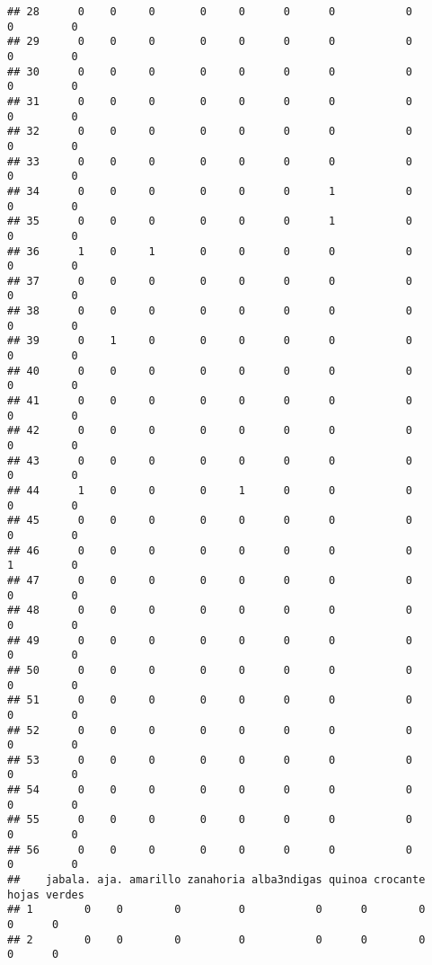 \documentclass[
]{article}
\begin{document}
\begin{verbatim}
## 28      0    0     0       0     0      0      0           0        0         0
## 29      0    0     0       0     0      0      0           0        0         0
## 30      0    0     0       0     0      0      0           0        0         0
## 31      0    0     0       0     0      0      0           0        0         0
## 32      0    0     0       0     0      0      0           0        0         0
## 33      0    0     0       0     0      0      0           0        0         0
## 34      0    0     0       0     0      0      1           0        0         0
## 35      0    0     0       0     0      0      1           0        0         0
## 36      1    0     1       0     0      0      0           0        0         0
## 37      0    0     0       0     0      0      0           0        0         0
## 38      0    0     0       0     0      0      0           0        0         0
## 39      0    1     0       0     0      0      0           0        0         0
## 40      0    0     0       0     0      0      0           0        0         0
## 41      0    0     0       0     0      0      0           0        0         0
## 42      0    0     0       0     0      0      0           0        0         0
## 43      0    0     0       0     0      0      0           0        0         0
## 44      1    0     0       0     1      0      0           0        0         0
## 45      0    0     0       0     0      0      0           0        0         0
## 46      0    0     0       0     0      0      0           0        1         0
## 47      0    0     0       0     0      0      0           0        0         0
## 48      0    0     0       0     0      0      0           0        0         0
## 49      0    0     0       0     0      0      0           0        0         0
## 50      0    0     0       0     0      0      0           0        0         0
## 51      0    0     0       0     0      0      0           0        0         0
## 52      0    0     0       0     0      0      0           0        0         0
## 53      0    0     0       0     0      0      0           0        0         0
## 54      0    0     0       0     0      0      0           0        0         0
## 55      0    0     0       0     0      0      0           0        0         0
## 56      0    0     0       0     0      0      0           0        0         0
##    jabala. aja. amarillo zanahoria alba3ndigas quinoa crocante hojas verdes
## 1        0    0        0         0           0      0        0     0      0
## 2        0    0        0         0           0      0        0     0      0

\end{verbatim}
\end{document}
